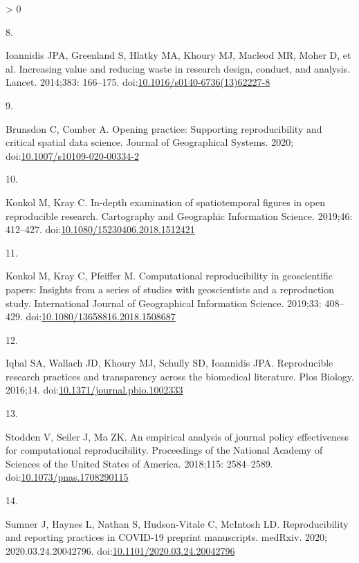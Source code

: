 \documentclass[10pt,letterpaper]{article}
\newlength{\csllabelwidth}
\newlength{\cslhangindent}
\newenvironment{CSLReferences}[3] %
 {%
  \setlength{\parindent}{0pt}
  \ifodd #1 \everypar{\setlength{\hangindent}{\cslhangindent}}\ignorespaces\fi
  \ifnum #2 > 0
  \setlength{\parskip}{#2\baselineskip}
  \fi
 }%
 {}
\newcommand{\CSLLeftMargin}[1]{\parbox[t]{\csllabelwidth}{#1}}
\newcommand{\CSLRightInline}[1]{\parbox[t]{\linewidth - \csllabelwidth}{#1}}
\begin{document}
\begin{CSLReferences}{0}{0}
\leavevmode\hypertarget{ref-Ioannidis2014increasing}{}%
\CSLLeftMargin{8. }
\CSLRightInline{Ioannidis JPA, Greenland S, Hlatky MA, Khoury MJ,
Macleod MR, Moher D, et al. Increasing value and reducing waste in
research design, conduct, and analysis. Lancet. 2014;383: 166--175.
doi:\href{https://doi.org/10.1016/s0140-6736(13)62227-8}{10.1016/s0140-6736(13)62227-8}}

\leavevmode\hypertarget{ref-Brunsdon2020opening}{}%
\CSLLeftMargin{9. }
\CSLRightInline{Brunsdon C, Comber A. Opening practice: Supporting
reproducibility and critical spatial data science. Journal of
Geographical Systems. 2020;
doi:\href{https://doi.org/10.1007/s10109-020-00334-2}{10.1007/s10109-020-00334-2}}

\leavevmode\hypertarget{ref-Konkol2019examination}{}%
\CSLLeftMargin{10. }
\CSLRightInline{Konkol M, Kray C. In-depth examination of spatiotemporal
figures in open reproducible research. Cartography and Geographic
Information Science. 2019;46: 412--427.
doi:\href{https://doi.org/10.1080/15230406.2018.1512421}{10.1080/15230406.2018.1512421}}

\leavevmode\hypertarget{ref-Konkol2019computational}{}%
\CSLLeftMargin{11. }
\CSLRightInline{Konkol M, Kray C, Pfeiffer M. Computational
reproducibility in geoscientific papers: Insights from a series of
studies with geoscientists and a reproduction study. International
Journal of Geographical Information Science. 2019;33: 408--429.
doi:\href{https://doi.org/10.1080/13658816.2018.1508687}{10.1080/13658816.2018.1508687}}

\leavevmode\hypertarget{ref-Iqbal2016reproducible}{}%
\CSLLeftMargin{12. }
\CSLRightInline{Iqbal SA, Wallach JD, Khoury MJ, Schully SD, Ioannidis
JPA. Reproducible research practices and transparency across the
biomedical literature. Plos Biology. 2016;14.
doi:\href{https://doi.org/10.1371/journal.pbio.1002333}{10.1371/journal.pbio.1002333}}

\leavevmode\hypertarget{ref-Stodden2018empirical}{}%
\CSLLeftMargin{13. }
\CSLRightInline{Stodden V, Seiler J, Ma ZK. An empirical analysis of
journal policy effectiveness for computational reproducibility.
Proceedings of the National Academy of Sciences of the United States of
America. 2018;115: 2584--2589.
doi:\href{https://doi.org/10.1073/pnas.1708290115}{10.1073/pnas.1708290115}}

\leavevmode\hypertarget{ref-Sumner2020reproducibility}{}%
\CSLLeftMargin{14. }
\CSLRightInline{Sumner J, Haynes L, Nathan S, Hudson-Vitale C, McIntosh
LD. Reproducibility and reporting practices in COVID-19 preprint
manuscripts. medRxiv. 2020; 2020.03.24.20042796.
doi:\href{https://doi.org/10.1101/2020.03.24.20042796}{10.1101/2020.03.24.20042796}}


\end{CSLReferences}
\end{document}
